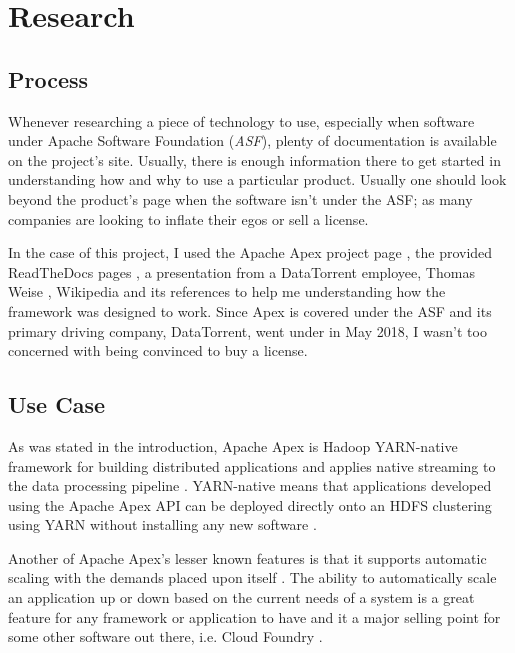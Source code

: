 \documentclass[final]{IEEEtran}
\begin{document}
\section{Research}
\subsection{Process}
Whenever researching a piece of technology to use, especially when software under Apache Software Foundation (\emph{ASF}), plenty of documentation is available on the project's site. Usually, there is enough information there to get started in understanding how and why to use a particular product. Usually one should look beyond the product's page when the software isn't under the ASF; as many companies are looking to inflate their egos or sell a license.

In the case of this project, I used the Apache Apex project page \cite{APEX}, the provided ReadTheDocs pages\cite{APEXrtd_dt} \cite{APEXrtd_apache} \cite{MALHAR-DOCS}, a presentation from a DataTorrent employee, Thomas Weise \cite{WEISE}, Wikipedia and its references \cite{WIKI} \cite{DATANAMI} to help me understanding how the framework was designed to work. Since Apex is covered under the ASF and its primary driving company, DataTorrent, went under in May 2018, I wasn't too concerned with being convinced to buy a license.

\subsection{Use Case}
As was stated in the introduction, Apache Apex is Hadoop YARN-native framework for building distributed applications and applies native streaming to the data processing pipeline \cite{WEISE}. YARN-native means that applications developed using the Apache Apex API can be deployed directly onto an HDFS clustering using YARN without installing any new software \cite{WEISE2}.

Another of Apache Apex's lesser known features is that it supports automatic scaling with the demands placed upon itself \cite{WEISE2}. The ability to automatically scale an application up or down based on the current needs of a system is a great feature for any framework or application to have and it a major selling point for some other software out there, i.e. Cloud Foundry \cite{CF}.
\end{document}
